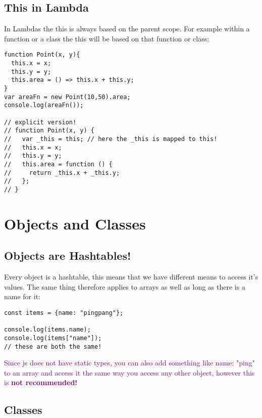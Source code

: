 \documentclass[main.tex,fontsize=6pt,paper=a4,paper=landscape,DIV=calc,]{scrartcl}
\begin{document}
\begin{multicols*}{4}
\subsection{This in Lambda} 
In Lambdas the this is always based on the parent scope.\newline
For example within a function or a class the this will be based on that function or class:
\vspace{-2mm}
\begin{lstlisting}
function Point(x, y){
  this.x = x;
  this.y = y;
  this.area = () => this.x + this.y;
}
var areaFn = new Point(10,50).area;
console.log(areaFn());

// explicit version!
// function Point(x, y) {
//   var _this = this; // here the _this is mapped to this!
//   this.x = x;
//   this.y = y;
//   this.area = function () {
//     return _this.x + _this.y;
//   };
// }
\end{lstlisting}
\vspace{2mm}


\section{Objects and Classes}

\subsection{Objects are Hashtables!} 
Every object is a hashtable, this means that we have different means to access it's values. \newline
The same thing therefore applies to arrays as well as long as there is a name for it:
\vspace{-2mm}
\begin{lstlisting}
const items = {name: "pingpang"};

console.log(items.name);
console.log(items["name"]);
// these are both the same!
\end{lstlisting}
\vspace{2mm}
\textcolor{purple}{Since js does not have static types, you can also add something like name: "ping" to an array and access it the same way you access any other object, however this is \textbf{not recommended!}}

\subsection{Classes} 


\end{multicols*}
\end{document}
